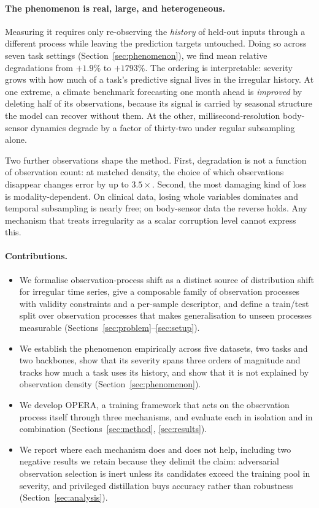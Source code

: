 \documentclass[sigconf,nonacm]{acmart}
\begin{document}
\paragraph{The phenomenon is real, large, and heterogeneous.}
Measuring it requires only re-observing the \emph{history} of held-out inputs through a different process while
leaving the prediction targets untouched. Doing so across seven task settings (Section~\ref{sec:phenomenon}), we
find mean relative degradations from $+1.9\%$ to $+1793\%$. The ordering is interpretable: severity grows with
how much of a task's predictive signal lives in the irregular history. At one extreme, a climate benchmark
forecasting one month ahead is \emph{improved} by deleting half of its observations, because its signal is
carried by seasonal structure the model can recover without them. At the other, millisecond-resolution
body-sensor dynamics degrade by a factor of thirty-two under regular subsampling alone.

Two further observations shape the method. First, degradation is not a function of observation count: at matched
density, the choice of which observations disappear changes error by up to $3.5\times$. Second, the most damaging
kind of loss is modality-dependent. On clinical data, losing whole variables dominates and temporal
subsampling is nearly free; on body-sensor data the reverse holds. Any mechanism that treats irregularity as a
scalar corruption level cannot express this.

\paragraph{Contributions.}
\begin{itemize}
\item We formalise observation-process shift as a distinct source of distribution shift for irregular time
series, give a composable family of observation processes with validity constraints and a per-sample
descriptor, and define a train/test split over observation processes that makes generalisation to unseen
processes measurable (Sections~\ref{sec:problem}--\ref{sec:setup}).
\item We establish the phenomenon empirically across five datasets, two tasks and two backbones, show that its
severity spans three orders of magnitude and tracks how much a task uses its history, and show that it is not
explained by observation density (Section~\ref{sec:phenomenon}).
\item We develop OPERA, a training framework that acts on the observation process itself through three
mechanisms, and evaluate each in isolation and in combination (Sections~\ref{sec:method}, \ref{sec:results}).
\item We report where each mechanism does and does not help, including two negative results we retain because
they delimit the claim: adversarial observation selection is inert unless its candidates exceed the training
pool in severity, and privileged distillation buys accuracy rather than robustness
(Section~\ref{sec:analysis}).
\end{itemize}
\end{document}
